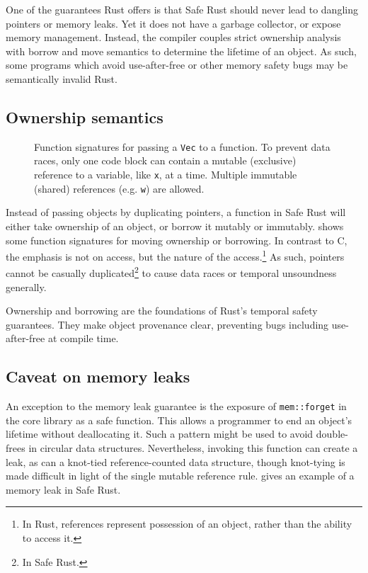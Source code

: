 \documentclass[dissertation.tex]{subfiles}
\begin{document}
One of the guarantees Rust offers is that Safe Rust should never lead to
dangling pointers or memory leaks.
Yet it does not have a garbage collector, or expose memory management.
Instead, the compiler couples strict ownership analysis with borrow and
move semantics to determine the lifetime of an object.
As such, some programs which avoid use-after-free or other memory safety
bugs may be semantically invalid Rust.

\subsection{Ownership semantics}

\begin{figure}[ht]
    
    \caption{
        Function signatures for passing a \texttt{Vec} to a function.
        To prevent data races, only one code block can contain a mutable
        (exclusive) reference to a variable, like \texttt{x}, at a time.
        Multiple immutable (shared) references (e.g. \texttt{w}) are
        allowed.
    }
    \label{lst:rust-ownership}
\end{figure}

Instead of passing objects by duplicating pointers, a function in Safe
Rust will either take ownership of an object, or borrow it mutably or
immutably.
 shows some function signatures for
moving ownership or borrowing.
In contrast to C, the emphasis is not on access, but the nature of the
access.\footnote{In Rust, references represent possession of an object,
rather than the ability to access it.}
As such, pointers cannot be casually duplicated\footnote{In Safe Rust.}
to cause data races or temporal unsoundness generally.

Ownership and borrowing are the foundations of Rust's temporal safety
guarantees.
They make object provenance clear, preventing bugs including
use-after-free at compile time.

\subsection{Caveat on memory leaks}
An exception to the memory leak guarantee is the exposure of
\texttt{mem::forget} in the core library as a safe function.
This allows a programmer to end an object's lifetime without
deallocating it.
Such a pattern might be used to avoid double-frees in circular data
structures.
Nevertheless, invoking this function can create a leak, as can a
knot-tied reference-counted data structure, though knot-tying is made
difficult in light of the single mutable reference rule.
 gives an example of a memory leak in
Safe Rust.
\end{document}
